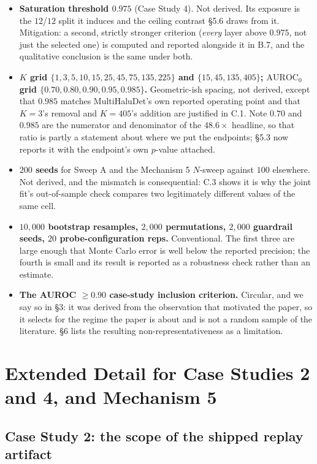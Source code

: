\documentclass[10pt]{article} %
\begin{document}
\begin{itemize}
\item \textbf{Saturation threshold $0.975$} (Case Study 4). Not derived. Its
  exposure is the $12$/$12$ split it induces and the ceiling contrast §5.6
  draws from it. Mitigation: a second, strictly stronger criterion (\emph{every}
  layer above $0.975$, not just the selected one) is computed and reported
  alongside it in B.7, and the qualitative conclusion is the same under both.
\item \textbf{$K$ grid $\{1,3,5,10,15,25,45,75,135,225\}$ and
  $\{15,45,135,405\}$; $\text{AUROC}_0$ grid
  $\{0.70,0.80,0.90,0.95,0.985\}$.} Geometric-ish spacing, not derived, except
  that $0.985$ matches MultiHaluDet's own reported operating point and that
  $K=3$'s removal and $K=405$'s addition are justified in C.1. Note $0.70$ and
  $0.985$ are the numerator and denominator of the $48.6\times$ headline, so
  that ratio is partly a statement about where we put the endpoints; §5.3 now
  reports it with the endpoint's own $p$-value attached.
\item \textbf{$200$ seeds} for Sweep A and the Mechanism 5 $N$-sweep against
  $100$ elsewhere. Not derived, and the mismatch is consequential: C.3 shows it
  is why the joint fit's out-of-sample check compares two legitimately
  different values of the same cell.
\item \textbf{$10{,}000$ bootstrap resamples, $2{,}000$ permutations,
  $2{,}000$ guardrail seeds, $20$ probe-configuration reps.} Conventional. The
  first three are large enough that Monte Carlo error is well below the
  reported precision; the fourth is small and its result is reported as a
  robustness check rather than an estimate.
\item \textbf{The AUROC $\geq0.90$ case-study inclusion criterion.} Circular,
  and we say so in §3: it was derived from the observation that motivated the
  paper, so it selects for the regime the paper is about and is not a random
  sample of the literature. §6 lists the resulting non-representativeness as a
  limitation.
\end{itemize}

\section{Extended Detail for Case Studies 2 and 4, and Mechanism 5}

\subsection{Case Study 2: the scope of the shipped replay artifact}
\end{document}
